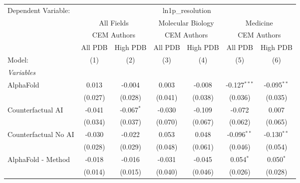 \begingroup
\centering
\begin{tabular}{lcccccc}
   \tabularnewline \midrule \midrule
   Dependent Variable: & \multicolumn{6}{c}{ln1p\_resolution}\\
 & \multicolumn{2}{c}{All Fields} & \multicolumn{2}{c}{Molecular Biology} & \multicolumn{2}{c}{Medicine} \\
\cmidrule(lr){2-3} \cmidrule(lr){4-5} \cmidrule(lr){6-7}
 & \multicolumn{2}{c}{CEM Authors} & \multicolumn{2}{c}{CEM Authors} & \multicolumn{2}{c}{CEM Authors} \\
\cmidrule(lr){2-3} \cmidrule(lr){4-5} \cmidrule(lr){6-7}
 & \multicolumn{1}{c}{All PDB} & \multicolumn{1}{c}{High PDB} & \multicolumn{1}{c}{All PDB} & \multicolumn{1}{c}{High PDB} & \multicolumn{1}{c}{All PDB} & \multicolumn{1}{c}{High PDB} \\
\cmidrule(lr){2-2} \cmidrule(lr){3-3} \cmidrule(lr){4-4} \cmidrule(lr){5-5} \cmidrule(lr){6-6} \cmidrule(lr){7-7}
   Model:                                                     & (1)     & (2)          & (3)           & (4)     & (5)            & (6)\\  
   \midrule
   \emph{Variables}\\
   AlphaFold                                                  & 0.013   & -0.004       & 0.003         & -0.008  & -0.127$^{***}$ & -0.095$^{**}$\\   
                                                              & (0.027) & (0.028)      & (0.041)       & (0.038) & (0.036)        & (0.035)\\   
   Counterfactual AI                                          & -0.041  & -0.067$^{*}$ & -0.030        & -0.109  & -0.072         & 0.007\\   
                                                              & (0.034) & (0.037)      & (0.070)       & (0.067) & (0.062)        & (0.065)\\   
   Counterfactual No AI                                       & -0.030  & -0.022       & 0.053         & 0.048   & -0.096$^{**}$  & -0.130$^{**}$\\   
                                                              & (0.028) & (0.029)      & (0.048)       & (0.061) & (0.046)        & (0.054)\\   
   AlphaFold - Method                                         & -0.018  & -0.016       & -0.031        & -0.045  & 0.054$^{*}$    & 0.050$^{*}$\\   
                                                              & (0.014) & (0.015)      & (0.040)       & (0.046) & (0.026)        & (0.028)\\   

\end{tabular}
